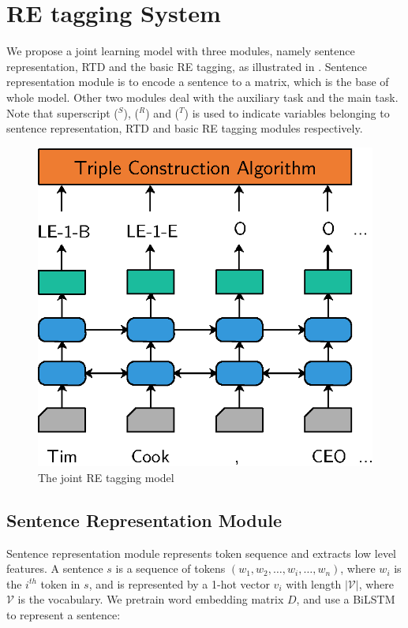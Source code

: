 \section{RE tagging System}
\label{sec:tagging}

We propose a joint learning model with three modules, namely
sentence representation, RTD and the basic RE tagging, 
as illustrated in . 
Sentence representation module is to encode a sentence to a matrix, which is the 
base of whole model. Other two modules deal with the auxiliary task and 
the main task. Note that superscript ($^S$), ($^R$) and ($^T$) is used
to indicate variables belonging to sentence representation,
RTD and basic RE tagging modules respectively.


\begin{figure}[th]
\centering
\includegraphics[width=\columnwidth]{pictures/model.eps}
\caption{The joint RE tagging model \label{fig:model}}
\end{figure}

\subsection{Sentence Representation Module}
Sentence representation module represents token sequence and extracts low level
features. A sentence $s$ is a sequence of tokens $(w_1, w_2, \ldots, w_i,
\ldots, w_n)$, where $w_i$ is the $i^{th}$ token in $s$, and is represented by
a 1-hot vector $v_i$ with length $|\mathcal{V}|$, where $\mathcal{V}$ is 
the vocabulary. We pretrain word embedding matrix $D$, and use a BiLSTM to
represent a sentence:


